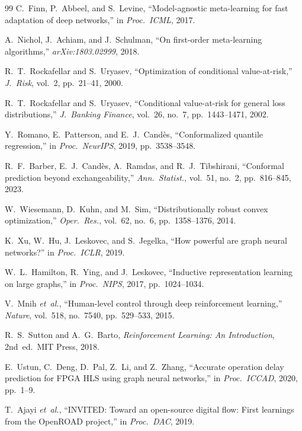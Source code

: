 \documentclass[journal]{IEEEtran}
\begin{document}
\begin{thebibliography}{99}
C.~Finn, P.~Abbeel, and S.~Levine, ``Model-agnostic meta-learning for fast adaptation of deep networks,'' in \emph{Proc.\ ICML}, 2017.

A.~Nichol, J.~Achiam, and J.~Schulman, ``On first-order meta-learning algorithms,'' \emph{arXiv:1803.02999}, 2018.

R.~T.~Rockafellar and S.~Uryasev, ``Optimization of conditional value-at-risk,'' \emph{J.\ Risk}, vol.~2, pp.~21--41, 2000.

R.~T.~Rockafellar and S.~Uryasev, ``Conditional value-at-risk for general loss distributions,'' \emph{J.\ Banking Finance}, vol.~26, no.~7, pp.~1443--1471, 2002.

Y.~Romano, E.~Patterson, and E.~J.~Cand\`{e}s, ``Conformalized quantile regression,'' in \emph{Proc.\ NeurIPS}, 2019, pp.~3538--3548.

R.~F.~Barber, E.~J.~Cand\`{e}s, A.~Ramdas, and R.~J.~Tibshirani, ``Conformal prediction beyond exchangeability,'' \emph{Ann.\ Statist.}, vol.~51, no.~2, pp.~816--845, 2023.

W.~Wiesemann, D.~Kuhn, and M.~Sim, ``Distributionally robust convex optimization,'' \emph{Oper.\ Res.}, vol.~62, no.~6, pp.~1358--1376, 2014.

K.~Xu, W.~Hu, J.~Leskovec, and S.~Jegelka, ``How powerful are graph neural networks?'' in \emph{Proc.\ ICLR}, 2019.

W.~L.~Hamilton, R.~Ying, and J.~Leskovec, ``Inductive representation learning on large graphs,'' in \emph{Proc.\ NIPS}, 2017, pp.~1024--1034.

V.~Mnih \emph{et~al.}, ``Human-level control through deep reinforcement learning,'' \emph{Nature}, vol.~518, no.~7540, pp.~529--533, 2015.

R.~S.~Sutton and A.~G.~Barto, \emph{Reinforcement Learning: An Introduction}, 2nd~ed.\ MIT Press, 2018.

E.~Ustun, C.~Deng, D.~Pal, Z.~Li, and Z.~Zhang, ``Accurate operation delay prediction for FPGA HLS using graph neural networks,'' in \emph{Proc.\ ICCAD}, 2020, pp.~1--9.

T.~Ajayi \emph{et~al.}, ``INVITED: Toward an open-source digital flow: First learnings from the OpenROAD project,'' in \emph{Proc.\ DAC}, 2019.


\end{thebibliography}
\end{document}
